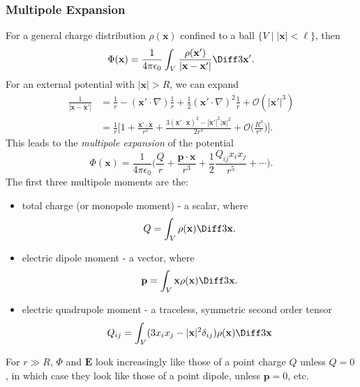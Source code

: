 \documentclass[12pt]{article}
\begin{document}
\subsubsection{Multipole Expansion}
\label{subsub:multipole_expansion}

For a general charge distribution $\rho(\mathbf{x})$ confined to a ball $\{V \mid |\mathbf{x}| < \ell\}$, then
\[
\Phi(\mathbf{x}) = \frac{1}{4 \pi \epsilon_0} \int_{V} \frac{\rho(\mathbf{x}')}{|\mathbf{x} - \mathbf{x}'|} \Diff3 \mathbf{x}'
.\]
For an external potential with $|\mathbf{x}| > R$, we can expand
\begin{align*}
	\frac{1}{|\mathbf{x} - \mathbf{x}'|} &= \frac{1}{r} - (\mathbf{x}' \cdot \nabla) \frac{1}{r} + \frac{1}{2} (\mathbf{x}' \cdot \nabla)^2 \frac{1}{r} + \mathcal{O}(|\mathbf{x}'|^3) \\
					     &= \frac{1}{r} \biggl[ 1 + \frac{\mathbf{x}' \cdot \mathbf{x}}{r^2} + \frac{3(\mathbf{x}' \cdot \mathbf{x})^2 - |\mathbf{x}'|^2|\mathbf{x}|^2}{2r^{4}} + \mathcal{O} \biggl( \frac{R^3}{r^3} \biggr) \biggr].
\end{align*}
This leads to the \emph{multipole expansion} of the potential
\[
\Phi(\mathbf{x}) = \frac{1}{4 \pi \epsilon_0} \biggl( \frac{Q}{r} + \frac{\mathbf{p} \cdot \mathbf{x}}{r^3} + \frac{1}{2} \frac{Q_{ij}x_ix_j}{r^{5}} + \cdots \biggr)
.\]
The first three multipole moments are the:
\begin{itemize}
	\item total charge (or monopole moment) - a scalar, where
		\[
			Q = \int_{V} \rho(\mathbf{x}) \Diff3 \mathbf{x}.
		\]
	\item electric dipole moment - a vector, where
		\[
			\mathbf{p} = \int_{V} \mathbf{x} \rho(\mathbf{x}) \Diff3 \mathbf{x}.
		\]
	\item electric quadrupole moment - a traceless, symmetric second order tensor
		\[
			Q_{ij} = \int_{V}(3x_ix_j - |\mathbf{x}|^2 \delta_{ij}) \rho(\mathbf{x}) \Diff3 \mathbf{x}
		\]
\end{itemize}

For $r \gg R$, $\Phi$ and $\mathbf{E}$ look increasingly like those of a point charge $Q$ unless $Q = 0$, in which case they look like those of a point dipole, unless $\mathbf{p} = 0$, etc.

\newpage

\printindex
\end{document}
